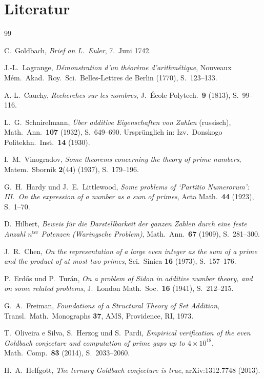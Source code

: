 \documentclass[12pt,a4paper]{amsart}
\theoremstyle{definition}
\begin{document}
\section*{Literatur}\label{sec:literatur}

\begin{thebibliography}{99}

C.\ Goldbach,
\textit{Brief an L.\ Euler}, 7.\ Juni 1742.

J.-L.\ Lagrange,
\textit{D\'{e}monstration d'un th\'{e}or\`{e}me d'arithm\'{e}tique},
Nouveaux M\'{e}m.\ Akad.\ Roy.\ Sci.\ Belles-Lettres de Berlin (1770),
S.\  123--133.

A.-L.\ Cauchy,
\textit{Recherches sur les nombres},
J.\ \'{E}cole Polytech.\ \textbf{9} (1813), S.\ 99--116.

L.\ G.\ Schnirelmann,
\textit{\"{U}ber additive Eigenschaften von Zahlen}
(russisch), Math.\ Ann.\ \textbf{107} (1932), S.\ 649--690.
Urspr\"{u}nglich in: Izv.\ Donskogo Politekhn.\ Inst.\ \textbf{14} (1930).

I.\ M.\ Vinogradov,
\textit{Some theorems concerning the theory of prime numbers},
Matem.\ Sbornik \textbf{2}(44) (1937), S.\ 179--196.

G.\ H.\ Hardy und J.\ E.\ Littlewood,
\textit{Some problems of `Partitio Numerorum': III.\ On the expression of
a number as a sum of primes},
Acta Math.\ \textbf{44} (1923), S.\ 1--70.

D.\ Hilbert,
\textit{Beweis f\"{u}r die Darstellbarkeit der ganzen Zahlen durch eine
feste Anzahl $n^{\text{ter}}$ Potenzen (Waringsche Problem)},
Math.\ Ann.\ \textbf{67} (1909), S.\ 281--300.

J.\ R.\ Chen,
\textit{On the representation of a large even integer as the sum of a
prime and the product of at most two primes},
Sci.\ Sinica \textbf{16} (1973), S.\ 157--176.

P.\ Erd\H{o}s und P.\ Tur\'{a}n,
\textit{On a problem of Sidon in additive number theory, and on some
related problems},
J.\ London Math.\ Soc.\ \textbf{16} (1941), S.\ 212--215.

G.\ A.\ Freiman,
\textit{Foundations of a Structural Theory of Set Addition},
Transl.\ Math.\ Monographs \textbf{37}, AMS, Providence, RI, 1973.

T.\ Oliveira e Silva, S.\ Herzog und S.\ Pardi,
\textit{Empirical verification of the even Goldbach conjecture and
computation of prime gaps up to $4 \times 10^{18}$},
Math.\ Comp.\ \textbf{83} (2014), S.\ 2033--2060.

H.\ A.\ Helfgott,
\textit{The ternary Goldbach conjecture is true},
arXiv:1312.7748 (2013).

\end{thebibliography}
\end{document}
